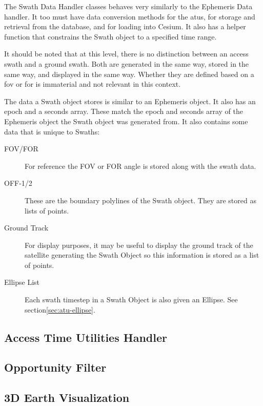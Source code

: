 The Swath Data Handler classes behaves very similarly to the Ephemeris Data
handler. It too must have data conversion methods for the \glspl{atu}, for
storage and retrieval from the database, and for loading into Cesium. It also
has a helper function that constrains the Swath object to a specified time
range. 

It should be noted that at this level, there is no distinction between an
access swath and a ground swath. Both are generated in the same way, stored in
the same way, and displayed in the same way. Whether they are defined based on
a \gls{fov} or \gls{for} is immaterial and not relevant in this context. 

The data a Swath object stores is similar to an Ephemeris object. It
also has an epoch and a seconds array. These match the epoch and seconds array
of the Ephemeris object the Swath object was generated from. It also contains
some data that is unique to Swaths:

\begin{description} 

    \item[FOV/FOR] For reference the FOV or FOR angle is stored along with the
	swath data.

    \item[OFF-1/2] These are the boundary polylines of the Swath object. They
	are stored as lists of points.

    \item[Ground Track] For display purposes, it may be useful to display the
	ground track of the satellite generating the Swath Object so this
	information is stored as a list of points.

    \item[Ellipse List] Each swath timestep in a Swath Object is also given an
	Ellipse. See section\ref{sec:atu-ellipse}.


\end{description}

\subsection{Access Time Utilities Handler}

\subsection{Opportunity Filter}

\subsection{3D Earth Visualization}

